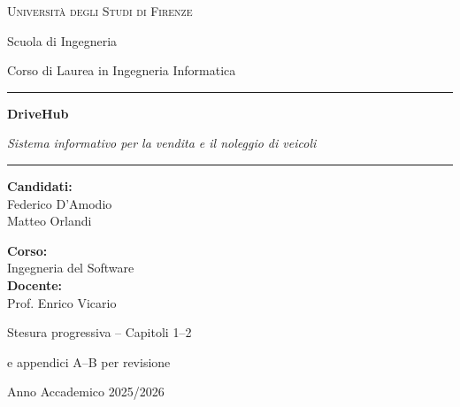 \documentclass[12pt,a4paper]{report}
\begin{document}
\hypersetup{pageanchor=false}
\begin{titlepage}
  \centering
  {\Large\textsc{Università degli Studi di Firenze}\par}
  {\large Scuola di Ingegneria\par}
  {\large Corso di Laurea in Ingegneria Informatica\par}
  \vspace{2cm}
  \rule{\linewidth}{.5pt}\par\vspace{.8cm}
  {\Huge\bfseries\color{blue!55!black} DriveHub\par}\vspace{.35cm}
  {\Large\itshape Sistema informativo per la vendita e il noleggio di veicoli\par}
  \vspace{.8cm}\rule{\linewidth}{.5pt}\par
  \vspace{1.7cm}
  \begin{minipage}[t]{.48\linewidth}\raggedright
    \textbf{Candidati:}\\[.3cm]
    Federico D'Amodio\\
    Matteo Orlandi
  \end{minipage}\hfill
  \begin{minipage}[t]{.48\linewidth}\raggedleft
    \textbf{Corso:}\\
    Ingegneria del Software\\[.35cm]
    \textbf{Docente:}\\
    Prof. Enrico Vicario
  \end{minipage}
  \vfill
  {\small Stesura progressiva -- Capitoli 1--2\par
  e appendici A--B per revisione\par}
  \vspace{.4cm}
  {\large Anno Accademico 2025/2026\par}
\end{titlepage}
\hypersetup{pageanchor=true}
\tableofcontents
\clearpage
{}





\appendix

\end{document}
